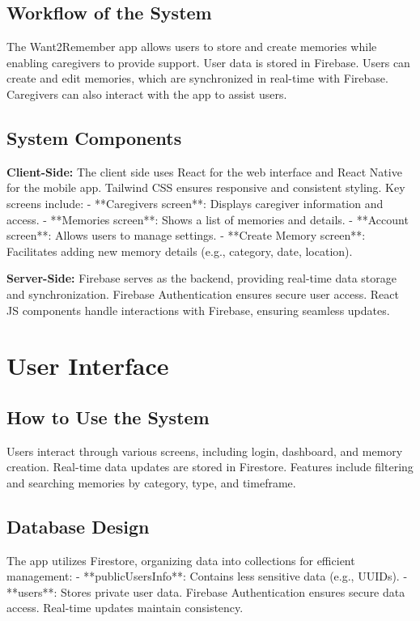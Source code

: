 \documentclass{article}
\begin{document}
\subsection{Workflow of the System}
The Want2Remember app allows users to store and create memories while enabling caregivers to provide support. User data is stored in Firebase. Users can create and edit memories, which are synchronized in real-time with Firebase. Caregivers can also interact with the app to assist users.

\subsection{System Components}
\textbf{Client-Side:} 
The client side uses React for the web interface and React Native for the mobile app. Tailwind CSS ensures responsive and consistent styling. Key screens include:
- **Caregivers screen**: Displays caregiver information and access.
- **Memories screen**: Shows a list of memories and details.
- **Account screen**: Allows users to manage settings.
- **Create Memory screen**: Facilitates adding new memory details (e.g., category, date, location).

\textbf{Server-Side:} 
Firebase serves as the backend, providing real-time data storage and synchronization. Firebase Authentication ensures secure user access. React JS components handle interactions with Firebase, ensuring seamless updates.

\section{User Interface}
\subsection{How to Use the System}
Users interact through various screens, including login, dashboard, and memory creation. Real-time data updates are stored in Firestore. Features include filtering and searching memories by category, type, and timeframe.

\subsection{Database Design}
The app utilizes Firestore, organizing data into collections for efficient management:
- **publicUsersInfo**: Contains less sensitive data (e.g., UUIDs).
- **users**: Stores private user data.
Firebase Authentication ensures secure data access. Real-time updates maintain consistency.
\end{document}

